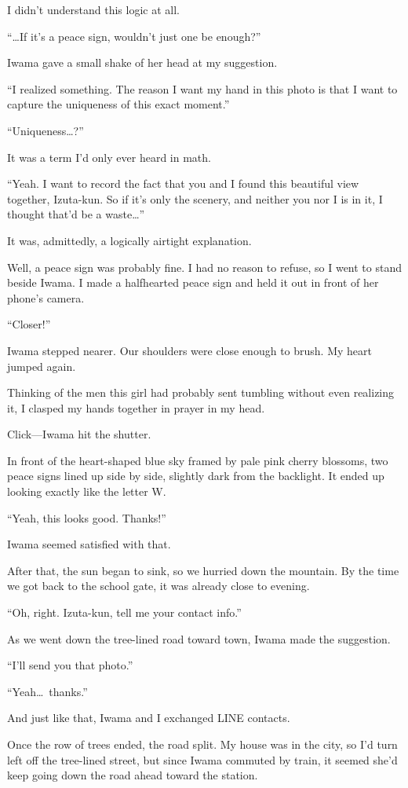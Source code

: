 \documentclass[
    a4paper,
    12pt,
    twoside,
    openany,
    UTF8,
    fontset=windows
]{ctexbook}
\begin{document}
I didn't understand this logic at all.

``\dots If it's a peace sign, wouldn't just one be enough?''

Iwama gave a small shake of her head at my suggestion.

``I realized something. The reason I want my hand in this photo is that I want to capture the uniqueness of this exact moment.''

``Uniqueness\dots?''

It was a term I'd only ever heard in math.

``Yeah. I want to record the fact that you and I found this beautiful view together, Izuta-kun. So if it's only the scenery, and neither you nor I is in it, I thought that'd be a waste\dots''

It was, admittedly, a logically airtight explanation.

Well, a peace sign was probably fine. I had no reason to refuse, so I went to stand beside Iwama. I made a halfhearted peace sign and held it out in front of her phone's camera.

``Closer!''

Iwama stepped nearer. Our shoulders were close enough to brush. My heart jumped again.

Thinking of the men this girl had probably sent tumbling without even realizing it, I clasped my hands together in prayer in my head.

Click---Iwama hit the shutter.

In front of the heart-shaped blue sky framed by pale pink cherry blossoms, two peace signs lined up side by side, slightly dark from the backlight. It ended up looking exactly like the letter W.

``Yeah, this looks good. Thanks!''

Iwama seemed satisfied with that.

After that, the sun began to sink, so we hurried down the mountain. By the time we got back to the school gate, it was already close to evening.

``Oh, right. Izuta-kun, tell me your contact info.''

As we went down the tree-lined road toward town, Iwama made the suggestion.

``I'll send you that photo.''

``Yeah\dots\ thanks.''

And just like that, Iwama and I exchanged LINE contacts.

Once the row of trees ended, the road split. My house was in the city, so I'd turn left off the tree-lined street, but since Iwama commuted by train, it seemed she'd keep going down the road ahead toward the station.
\end{document}
